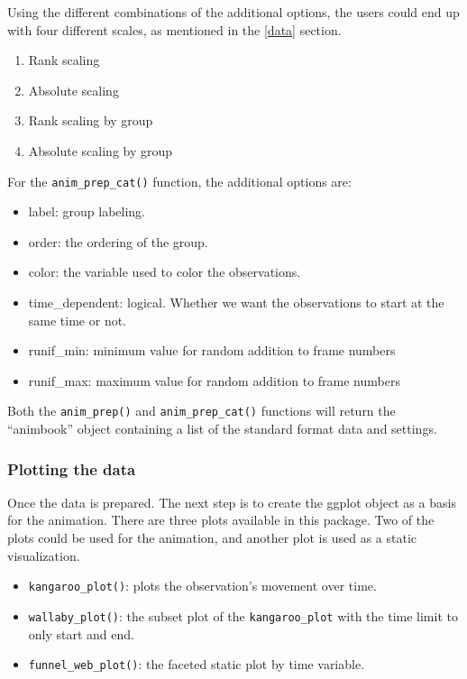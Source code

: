 Using the different combinations of the additional options, the users could end up with four different scales, as mentioned in the \ref{data} section.

\begin{enumerate}
\def\labelenumi{\arabic{enumi}.}
\item
  Rank scaling
\item
  Absolute scaling
\item
  Rank scaling by group
\item
  Absolute scaling by group
\end{enumerate}

For the \texttt{anim\_prep\_cat()} function, the additional options are:

\begin{itemize}
\tightlist
\item
  label: group labeling.
\item
  order: the ordering of the group.
\item
  color: the variable used to color the observations.
\item
  time\_dependent: logical. Whether we want the observations to start at the same time or not.
\item
  runif\_min: minimum value for random addition to frame numbers
\item
  runif\_max: maximum value for random addition to frame numbers
\end{itemize}

Both the \texttt{anim\_prep()} and \texttt{anim\_prep\_cat()} functions will return the ``animbook'' object containing a list of the standard format data and settings.

\hypertarget{plotting-the-data}{%
\subsubsection{Plotting the data}\label{plotting-the-data}}

Once the data is prepared. The next step is to create the ggplot object as a basis for the animation. There are three plots available in this package. Two of the plots could be used for the animation, and another plot is used as a static visualization.

\begin{itemize}
\tightlist
\item
  \texttt{kangaroo\_plot()}: plots the observation's movement over time.
\item
  \texttt{wallaby\_plot()}: the subset plot of the \texttt{kangaroo\_plot} with the time limit to only start and end.
\item
  \texttt{funnel\_web\_plot()}: the faceted static plot by time variable.
\end{itemize}

